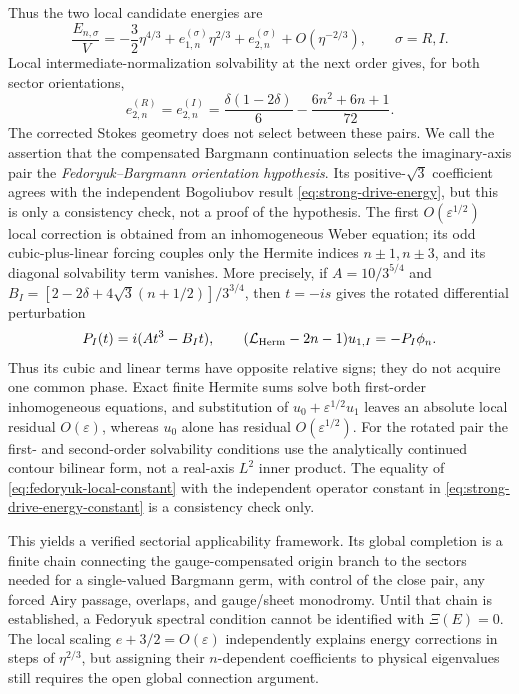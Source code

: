 \documentclass[11pt]{article}
\theoremstyle{remark}
\begin{document}
Thus the two local candidate energies are
\begin{equation}
 \frac{E_{n,\sigma}}{V}=-\frac32\eta^{4/3}
 +e_{1,n}^{(\sigma)}\eta^{2/3}+e_{2,n}^{(\sigma)}
 +O(\eta^{-2/3}),
 \qquad \sigma=R,I.
 \label{eq:fedoryuk-local-energies}
\end{equation}
Local intermediate-normalization solvability at the next order gives, for
both sector orientations,
\begin{equation}
 e_{2,n}^{(R)}=e_{2,n}^{(I)}
 =\frac{\delta(1-2\delta)}6-\frac{6n^2+6n+1}{72}.
 \label{eq:fedoryuk-local-constant}
\end{equation}
The corrected Stokes geometry does not select between these pairs.  We call
the assertion that the compensated Bargmann continuation selects the
imaginary-axis pair the \emph{Fedoryuk--Bargmann orientation hypothesis}.
Its positive-\(\sqrt3\) coefficient agrees with the independent
Bogoliubov result \eqref{eq:strong-drive-energy}, but this is only a
consistency check, not a proof of the hypothesis.  The first
\(O(\varepsilon^{1/2})\) local correction is obtained from an inhomogeneous
Weber equation; its odd cubic-plus-linear forcing couples only the Hermite
indices \(n\mathbin{\pm}1,n\mathbin{\pm}3\), and its diagonal solvability
term vanishes.  More precisely, if
\(A=10/3^{5/4}\) and
\(B_I=[2-2\delta+4\sqrt3(n+1/2)]/3^{3/4}\), then \(t=-is\) gives the
rotated differential perturbation
\begin{equation}
 P_I(t)=i(At^3-B_It),
 \qquad (\mathcal{L}_{\rm Herm}-2n-1)u_{1,I}=-P_I\phi_n.
 \label{eq:fedoryuk-rotated-perturbation}
\end{equation}
Thus its cubic and linear terms have opposite relative signs; they do not
acquire one common phase.  Exact finite Hermite sums solve both first-order
inhomogeneous equations, and substitution of \(u_0+\varepsilon^{1/2}u_1\)
leaves an absolute local residual \(O(\varepsilon)\), whereas \(u_0\) alone
has residual \(O(\varepsilon^{1/2})\).  For the rotated pair the first- and
second-order solvability conditions use the analytically continued contour
bilinear form, not a real-axis \(L^2\) inner product.  The equality of
\eqref{eq:fedoryuk-local-constant} with the independent operator constant in
\eqref{eq:strong-drive-energy-constant} is a consistency check only.

This yields a verified sectorial applicability framework.  Its global
completion is a finite chain connecting the gauge-compensated origin branch
to the sectors needed for a single-valued Bargmann germ, with control of the
close pair, any forced Airy passage, overlaps, and gauge/sheet monodromy.
Until that chain is established, a Fedoryuk spectral condition cannot be
identified with \(\Xi(E)=0\).  The local scaling
\(e+3/2=O(\varepsilon)\) independently explains energy corrections in steps
of \(\eta^{2/3}\), but assigning their \(n\)-dependent coefficients to
physical eigenvalues still requires the open global connection argument.
\end{document}
